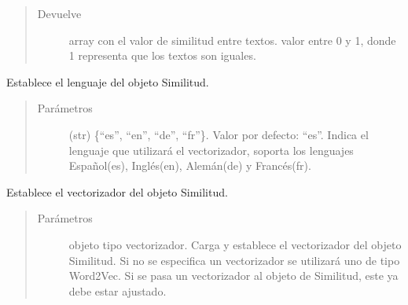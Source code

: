 \documentclass[letterpaper,10pt,openany,spanish]{sphinxmanual}
\begin{document}
\begin{fulllineitems}
\begin{fulllineitems}
\begin{quote}
\begin{description}
\item[{Devuelve}] \leavevmode
array con el valor de similitud entre textos. valor entre  
0 y 1, donde 1 representa que los textos son iguales.

\end{description}\end{quote}

\end{fulllineitems}


\begin{fulllineitems}
\label{\detokenize{funciones/comparacion:comparacion.Similitud.establecer_lenguaje}}
Establece el lenguaje del objeto Similitud.
\begin{quote}\begin{description}
\item[{Parámetros}] \leavevmode
{} \textendash{} (str) \{“es”, “en”, “de”, “fr”\}. 
Valor por defecto: “es”. Indica el lenguaje que utilizará el 
vectorizador, soporta los lenguajes Español(es), Inglés(en), 
Alemán(de) y Francés(fr).

\end{description}\end{quote}

\end{fulllineitems}


\begin{fulllineitems}
\label{\detokenize{funciones/comparacion:comparacion.Similitud.establecer_vectorizador}}
Establece el vectorizador del objeto Similitud.
\begin{quote}\begin{description}
\item[{Parámetros}] \leavevmode
{} \textendash{} objeto tipo vectorizador. Carga y establece el 
vectorizador del objeto Similitud. Si no se especifica un 
vectorizador se utilizará uno de tipo Word2Vec. Si se pasa un 
vectorizador al objeto de Similitud, este ya debe estar ajustado.


\end{description}
\end{quote}
\end{fulllineitems}
\end{fulllineitems}
\end{document}
